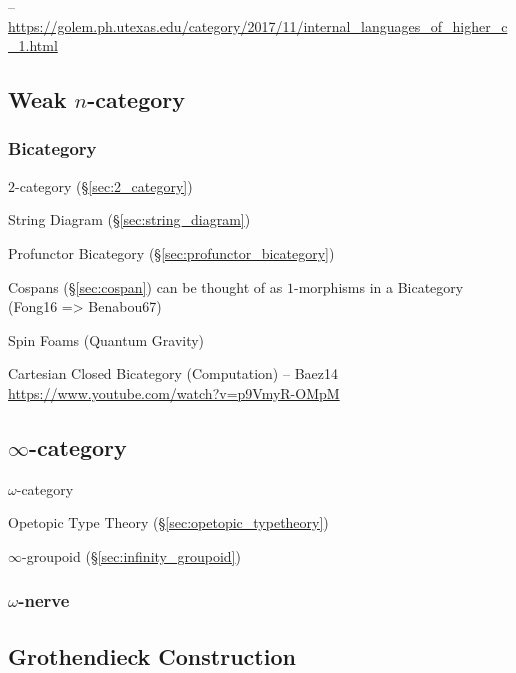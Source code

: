--\url{https://golem.ph.utexas.edu/category/2017/11/internal_languages_of_higher_c_1.html}



\subsection{Weak $n$-category}\label{sec:weak_ncategory}

\subsubsection{Bicategory}\label{sec:bicategory}

$2$-category (\S\ref{sec:2_category})

String Diagram (\S\ref{sec:string_diagram})

Profunctor Bicategory (\S\ref{sec:profunctor_bicategory})

Cospans (\S\ref{sec:cospan}) can be thought of as $1$-morphisms in a
Bicategory (Fong16 => Benabou67)

Spin Foams (Quantum Gravity)

Cartesian Closed Bicategory (Computation) -- Baez14
\url{https://www.youtube.com/watch?v=p9VmyR-OMpM}



\subsection{$\infty$-category}\label{sec:infinity_category}

$\omega$-category

Opetopic Type Theory (\S\ref{sec:opetopic_typetheory})

\fist $\infty$-groupoid (\S\ref{sec:infinity_groupoid})



\subsubsection{$\omega$-nerve}\label{sec:omega_nerve}



\subsection{Grothendieck Construction}
\label{sec:grothendieck_construction}

